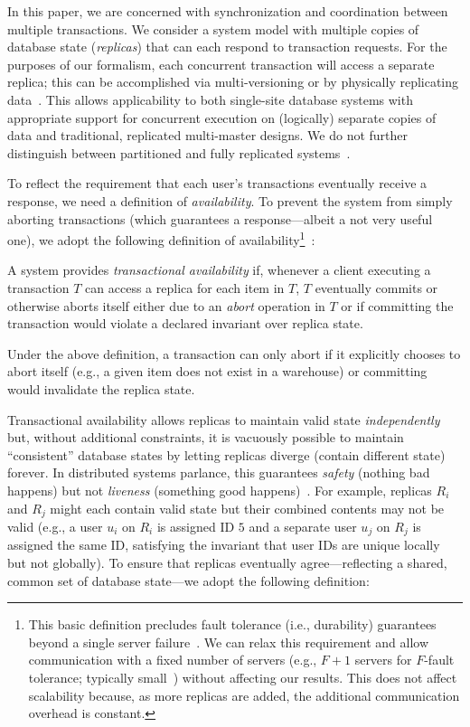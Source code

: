  In this paper, we are concerned with
synchronization and coordination between multiple transactions. We
consider a system model with multiple copies of database state
(\textit{replicas}) that can each respond to transaction requests. For
the purposes of our formalism, each concurrent transaction will access
a separate replica; this can be accomplished via multi-versioning or
by physically replicating data~\cite{bernstein-book}. This allows
applicability to both single-site database systems with appropriate
support for concurrent execution on (logically) separate copies of
data and traditional, replicated multi-master designs. We do not
further distinguish between partitioned and fully replicated
systems~\cite{hat-vldb}.

 To reflect the requirement that each user's
transactions eventually receive a response, we need a definition of
\textit{availability}. To prevent the system from simply aborting
transactions (which guarantees a response---albeit a not very useful
one), we adopt the following definition of availability\footnote{This
  basic definition precludes fault tolerance (i.e., durability)
  guarantees beyond a single server failure~\cite{hat-vldb}. We can
  relax this requirement and allow communication with a fixed number
  of servers (e.g., $F+1$ servers for $F$-fault tolerance; typically
  small~\cite{spanner,dynamo,megastore}) without affecting our
  results. This does not affect scalability because, as more replicas
  are added, the additional communication overhead is
  constant.}~\cite{hat-vldb}:

\begin{definition} 
A system provides \textit{transactional availability} if, whenever a
client executing a transaction $T$ can access a replica for each item
in $T$, $T$ eventually commits or otherwise aborts itself either due
to an \textit{abort} operation in $T$ or if committing the transaction
would violate a declared invariant over replica state.
\end{definition}

Under the above definition, a transaction can only abort if it
explicitly chooses to abort itself (e.g., a given item does not exist
in a warehouse) or committing would invalidate the replica state.

 Transactional availability allows replicas to
maintain valid state \textit{independently} but, without additional
constraints, it is vacuously possible to maintain ``consistent''
database states by letting replicas diverge (contain different state)
forever. In distributed systems parlance, this guarantees
\textit{safety} (nothing bad happens) but not \textit{liveness}
(something good happens)~\cite{schneider-concurrent}. For example,
replicas $R_i$ and $R_j$ might each contain valid state but their
combined contents may not be valid (e.g., a user $u_i$ on $R_i$ is
assigned ID $5$ and a separate user $u_j$ on $R_j$ is assigned the
same ID, satisfying the invariant that user IDs are unique locally but
not globally). To ensure that replicas eventually agree---reflecting a
shared, common set of database state---we adopt the following
definition:

